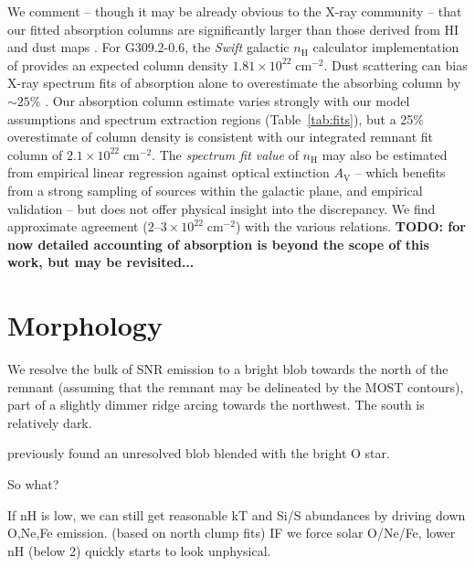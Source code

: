 \documentclass[preprint2,tighten,trackchanges]{aastex6}
\newcommand*{\mt}{\mathrm}
\newcommand*{\unit}[1]{\;\mt{#1}}  %
\newcommand*{\abt}{\mathord{\sim}} %
\newcommand*{\nH}{n_{\mathrm{H}}}
\newcommand*{\nHunits}{\times 10^{22} \unit{cm^{-2}}}
\newcommand*{\AV}{A_{\mathrm{V}}}
\begin{document}
We comment -- though it may be already obvious to the X-ray community -- that
our fitted absorption columns are significantly larger than those derived from
HI and dust maps \citep[e.g.,][]{willingale2013}.
For G309.2-0.6, the \textit{Swift} galactic $\nH$ calculator implementation of
\citet{willingale2013} provides an expected column density $1.81 \nHunits$.
Dust scattering can bias X-ray spectrum fits of absorption alone to
overestimate the absorbing column by $\abt25\%$ \citep{corrales2016}.
Our absorption column estimate varies strongly with our model assumptions and
spectrum extraction regions (Table~\ref{tab:fits}), but a 25\% overestimate of
column density is consistent with our integrated remnant fit column of $2.1
\nHunits$.
The \textit{spectrum fit value} of $\nH$ may also be estimated from empirical
linear regression against optical extinction $\AV$ \citep[e.g.,][]{foight2015}
-- which benefits from a strong sampling of sources within the galactic plane,
and empirical validation -- but does not offer physical insight into the
discrepancy. We find approximate agreement ($2$--$3 \nHunits$) with the various
relations.
\textbf{TODO: for now detailed accounting of absorption is beyond the scope of
this work, but may be revisited...}


\section{Morphology}

We resolve the bulk of SNR emission to a bright blob towards the north of the
remnant (assuming that the remnant may be delineated by the MOST contours),
part of a slightly dimmer ridge arcing towards the northwest.
The south is relatively dark.

 previously found an unresolved blob blended with the bright O
star.

So what?



If nH is low, we can still get reasonable kT and Si/S abundances
by driving down O,Ne,Fe emission. (based on north clump fits)
IF we force solar O/Ne/Fe, lower nH (below 2) quickly starts to look
unphysical.
\end{document}
